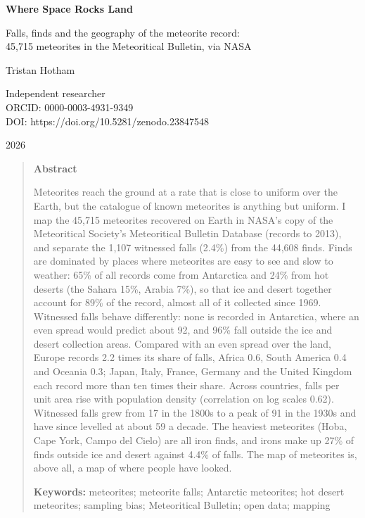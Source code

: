 \documentclass[11pt,a4paper]{article}
\begin{document}
\begin{center}
{\Large\bfseries Where Space Rocks Land\par}
\vspace{0.4em}
{\large Falls, finds and the geography of the meteorite record:\\45,715 meteorites in the Meteoritical Bulletin, via NASA\par}
\vspace{1.2em}
{\large Tristan Hotham\par}
\vspace{0.3em}
{\small Independent researcher\\
ORCID: 0000-0003-4931-9349\\
DOI: https://doi.org/10.5281/zenodo.23847548\par}
\vspace{0.8em}
2026
\end{center}

\begin{quote}
\small
\begin{center}\textbf{Abstract}\end{center}
Meteorites reach the ground at a rate that is close to uniform over the Earth, but the catalogue of known meteorites is anything but uniform. I map the 45,715 meteorites recovered on Earth in NASA's copy of the Meteoritical Society's Meteoritical Bulletin Database (records to 2013), and separate the 1,107 witnessed falls (2.4\%) from the 44,608 finds. Finds are dominated by places where meteorites are easy to see and slow to weather: 65\% of all records come from Antarctica and 24\% from hot deserts (the Sahara 15\%, Arabia 7\%), so that ice and desert together account for 89\% of the record, almost all of it collected since 1969. Witnessed falls behave differently: none is recorded in Antarctica, where an even spread would predict about 92, and 96\% fall outside the ice and desert collection areas. Compared with an even spread over the land, Europe records 2.2 times its share of falls, Africa 0.6, South America 0.4 and Oceania 0.3; Japan, Italy, France, Germany and the United Kingdom each record more than ten times their share. Across countries, falls per unit area rise with population density (correlation on log scales 0.62). Witnessed falls grew from 17 in the 1800s to a peak of 91 in the 1930s and have since levelled at about 59 a decade. The heaviest meteorites (Hoba, Cape York, Campo del Cielo) are all iron finds, and irons make up 27\% of finds outside ice and desert against 4.4\% of falls. The map of meteorites is, above all, a map of where people have looked.

\textbf{Keywords:} meteorites; meteorite falls; Antarctic meteorites; hot desert meteorites; sampling bias; Meteoritical Bulletin; open data; mapping
\end{quote}
\end{document}
